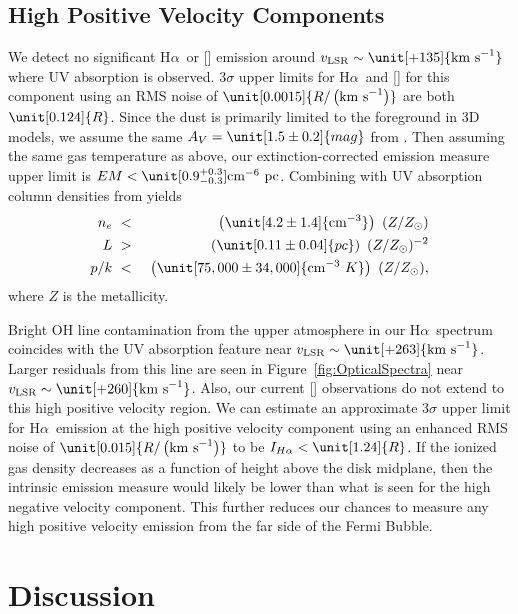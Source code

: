\documentclass[twocolumn]{aastex63}
\newcommand{\nii}{\ion{N}{2}}
\newcommand{\ha}{H\ensuremath{\alpha}}
\newcommand{\kms}{\mathrm{km~s}\ensuremath{^{-1}}}
\newcommand{\vlsr}{\ensuremath{v_\mathrm{LSR}}}
\begin{document}
\subsection{High Positive Velocity Components}\label{sec:meth:upper}
We detect no significant \ha\ or [\nii] emission around $\vlsr \sim \unit[+135]{\kms}$ where UV absorption is observed. 
$3\sigma$ upper limits for \ha\ and [\nii] for this component using an RMS noise of $\unit[0.0015]{R/\left(\kms\right)}$ are both $\unit[0.124]{R}$. 
Since the dust is primarily limited to the foreground in $3$D models, we assume the same $A_V = \unit[1.5 \pm 0.2]{mag}$ from \citet{Green2019}. 
Then assuming the same gas temperature as above, our extinction-corrected emission measure upper limit is $EM < \unit[0.9^{+0.3}_{-0.3}]{\textrm{cm}^{-6}~\textrm{pc}}$. 
Combining with UV absorption column densities from \citet{Bordoloi2017} yields 
\begin{eqnarray*}
  n_e & ~<~ & \left(\unit[4.2 \pm 1.4]{\textrm{cm}^{-3}}\right)~({Z}/{Z_\odot}) \\
  L & ~>~ & \left(\unit[0.11 \pm 0.04]{pc}\right)~({Z}/{Z_\odot})^{-2} \\
  {p}/{k} & ~<~ & \left(\unit[75,000 \pm 34,000]{\textrm{cm}^{-3}~K}\right)~({Z}/{Z_\odot}),
\end{eqnarray*}
where $Z$ is the metallicity.

Bright OH line contamination from the upper atmosphere in our \ha\ spectrum coincides with the UV absorption feature near $\vlsr \sim \unit[+263]{\kms}$. Larger residuals from this line are seen in Figure~\ref{fig:OpticalSpectra} near $\vlsr \sim \unit[+260]{\kms}$. Also, our current [\nii] observations do not extend to this high positive velocity region. We can estimate an approximate $3\sigma$ upper limit for \ha\ emission at the high positive velocity component using an enhanced RMS noise of $\unit[0.015]{R/\left(\kms\right)}$ to be $I_{\ha} < \unit[1.24]{R}$. If the ionized gas density decreases as a function of height above the disk midplane, then the intrinsic emission measure would likely be lower than what is seen for the high negative velocity component. This further reduces our chances to measure any high positive velocity emission from the far side of the Fermi Bubble.





\section{Discussion} \label{sec:disc}
\end{document}
